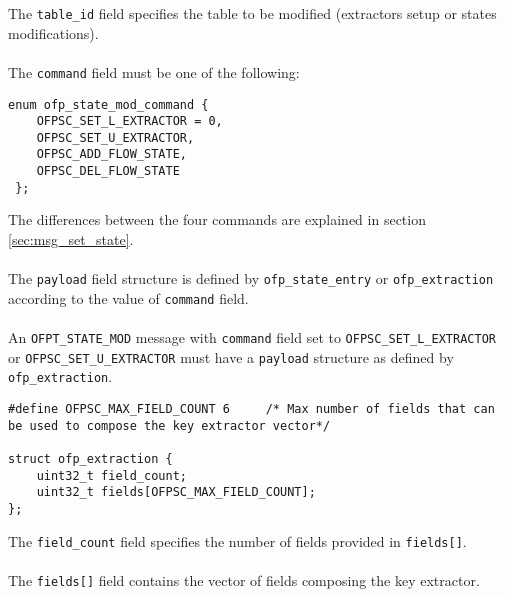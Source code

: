 \noindent
The \texttt{table\_id} field specifies the table to be modified (extractors setup or states modifications).
\\\\
The \texttt{command} field must be one of the following:
\scriptsize
\begin{verbatim}
enum ofp_state_mod_command {
    OFPSC_SET_L_EXTRACTOR = 0,
    OFPSC_SET_U_EXTRACTOR,
    OFPSC_ADD_FLOW_STATE,   
    OFPSC_DEL_FLOW_STATE
 };
\end{verbatim}
\normalsize
The differences between the four commands are explained in section \ref{sec:msg_set_state}.
\\\\
The \texttt{payload} field structure is defined by \texttt{ofp\_state\_entry} or \texttt{ofp\_extraction} according to the value of \texttt{command} field.
\\\\
An \texttt{OFPT\_STATE\_MOD} message with \texttt{command} field set to \texttt{OFPSC\_SET\_L\_EXTRACTOR} or \texttt{OFPSC\_SET\_U\_EXTRACTOR} must have a \texttt{payload} structure as defined by \texttt{ofp\_extraction}.
\scriptsize
\begin{verbatim}
#define OFPSC_MAX_FIELD_COUNT 6     /* Max number of fields that can be used to compose the key extractor vector*/

struct ofp_extraction {
    uint32_t field_count;
    uint32_t fields[OFPSC_MAX_FIELD_COUNT];
};
\end{verbatim}
\normalsize
The \texttt{field\_count} field specifies the number of fields provided in \texttt{fields[]}.
\\\\The \texttt{fields[]} field contains the vector of fields composing the key extractor.

